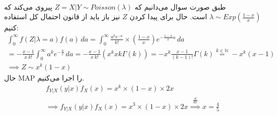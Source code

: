 \\
طبق صورت سوال می‌دانیم که
$Z = X | Y \sim Poisson(\lambda)$
پیروی می‌کند که
$\lambda \sim Exp(\frac{1-x}{x})$
است. حال برای پیدا کردن
$Z$
نیز باز باید از قانون احتمال کل استفاده کنیم:
\begin{gather*}
    \int_0^{\infty} f(Z | \lambda = a) f(a) \, da =
    \int_0^{\infty} \frac{a^k e^{-a}}{k!} \times (\frac{1-x}{x}) e^{-\frac{1-x}{x}a}\, da\\
    = -\frac{x-1}{x ~ k!} \int_0^{\infty} a^k e^{-\frac{a}{x}}\, da
    = -\frac{x-1}{x ~ k!} (x^k xk \Gamma(k)) = -x^k \frac{x-1}{(k-1)!} \Gamma(k)
    \stackrel{k \in \mathbb{N}}{=} -x^k (x-1)\\
    \implies Z \sim x^k (1-x)
\end{gather*}
حال
MAP
را اجرا می‌کنیم.
\begin{gather*}
    f_{Y|X}(y|x)f_{X}(x) = x^k \times (1-x) \times 2x\\
    \implies f_{Y|X}(y|x)f_{X}(x) = x^3 \times (1-x) \times 2x
    \stackrel{\frac{d}{dx}}{\implies} x = \frac{4}{5}
\end{gather*}